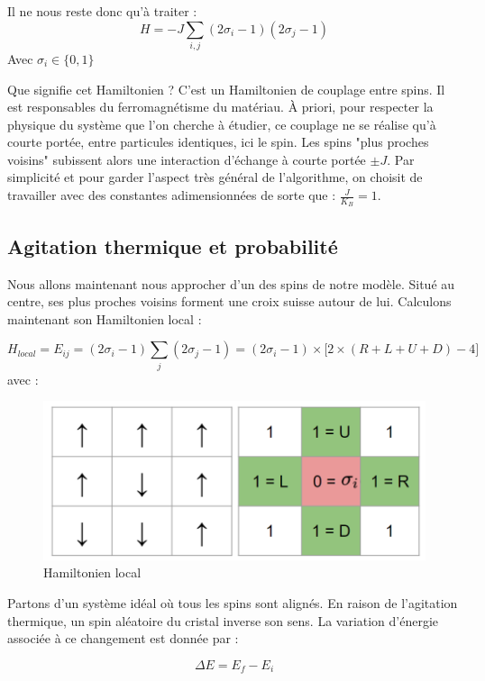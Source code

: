 \documentclass[11pt, parskip=half]{scrartcl} %
\begin{document}
Il ne nous reste donc qu'à traiter :
\begin{equation*}
	H = -J  \displaystyle \sum_{i,j}(2\sigma_{i}-1)(2\sigma_{j}-1)
\end{equation*}
Avec $\sigma_{i} \in \{0,1\}$

Que signifie cet Hamiltonien ? C'est un Hamiltonien de couplage entre spins. Il est responsables du ferromagnétisme du matériau. À priori, pour respecter la physique du système que l'on cherche à étudier, ce couplage ne se réalise qu'à courte portée, entre particules identiques, ici le spin. Les spins "plus proches voisins" subissent alors une interaction d'échange à courte portée $\pm J$. Par simplicité et pour garder l'aspect très général de l'algorithme, on choisit de travailler avec des constantes adimensionnées de sorte que : $\frac{J}{K_B} = 1$.

\subsection{Agitation thermique et probabilité}
Nous allons maintenant nous approcher d'un des spins de notre modèle. Situé au centre, ses plus proches voisins forment une croix suisse autour de lui. Calculons maintenant son Hamiltonien local :

\begin{equation*}
	H_{local} = E_{ij} =  (2\sigma_{i}-1) \displaystyle \sum_{j}(2\sigma_{j}-1) = (2\sigma_{i}-1) \times \bigg[ 2\times( R + L + U + D ) -4 \bigg]
\end{equation*}
avec :

\begin{figure}[h]
	\centering
	\includegraphics[width=0.5\linewidth]{./figures/H.png}
	\caption{Hamiltonien local}
	\label{fig:H}
\end{figure}

Partons d'un système idéal où tous les spins sont alignés. En raison de l'agitation thermique, un spin aléatoire du cristal inverse son sens. La variation d'énergie associée à ce changement est donnée par :

\begin{equation*}
	\Delta E = E_f - E_i
\end{equation*}
\end{document}
